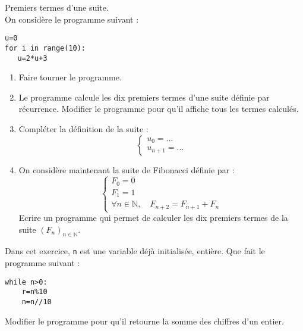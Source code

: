 \begin{exercice}Premiers termes d'une suite.\\
On consid\` ere le programme suivant :
\begin{verbatim}
u=0
for i in range(10):
   u=2*u+3
\end{verbatim}
\begin{enumerate}
\item Faire tourner le programme.
\item Le programme calcule les dix premiers termes d'une suite d\' efinie par r\' ecurrence. Modifier le programme pour qu'il affiche tous les termes calcul\' es.
\item Compl\' eter la d\' efinition de la suite :
\[\left\lbrace\begin{array}{l}
u_0=...\\
u_{n+1}=...
\end{array}\right.\]
\item On consid\` ere maintenant la suite de Fibonacci d\' efinie par :
\[\left\lbrace\begin{array}{l}
F_0=0\\
F_1=1\\
\forall n\in\mathbb{N}, \quad F_{n+2}=F_{n+1}+F_n
\end{array}\right.\]
Ecrire un programme qui permet de calculer les dix premiers termes de la suite $(F_n)_{n\in\mathbb{N}}$. 
\end{enumerate}
\end{exercice}
\bigskip


\newpage

\begin{exercice}
Dans cet exercice, \verb?n? est une variable déjà initialisée, entière. Que fait le programme suivant :
\begin{verbatim}
while n>0:
    r=n%10
    n=n//10 
\end{verbatim}
Modifier le programme pour qu'il retourne la somme des chiffres d'un entier.
\end{exercice}
\bigskip







